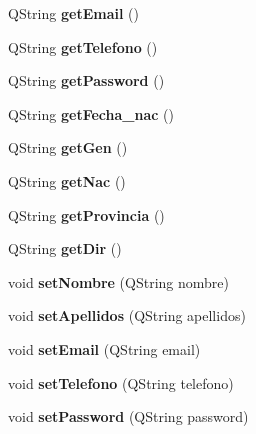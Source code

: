 \begin{DoxyCompactItemize}
Q\+String {\bfseries get\+Email} ()
\item 
\mbox{\label{classUser_a94361359fc402cecf21f3ac7189121d7}} 
Q\+String {\bfseries get\+Telefono} ()
\item 
\mbox{\label{classUser_a96d673c7c62ecdfdd4c509db8350262d}} 
Q\+String {\bfseries get\+Password} ()
\item 
\mbox{\label{classUser_a038bc7578cc67dc65dcc37cab56011cc}} 
Q\+String {\bfseries get\+Fecha\+\_\+nac} ()
\item 
\mbox{\label{classUser_af6978ab530e6b4516575c569245e1cb1}} 
Q\+String {\bfseries get\+Gen} ()
\item 
\mbox{\label{classUser_a35bb4fee2f8b12cf69eb25b7949cd85c}} 
Q\+String {\bfseries get\+Nac} ()
\item 
\mbox{\label{classUser_a539732e0d7d830e5027648c429c7d1ff}} 
Q\+String {\bfseries get\+Provincia} ()
\item 
\mbox{\label{classUser_a1bbfd504de0babb6591de36bc7994673}} 
Q\+String {\bfseries get\+Dir} ()
\item 
\mbox{\label{classUser_ac8bd16ed398601492fc2550d64fa55a2}} 
void {\bfseries set\+Nombre} (Q\+String nombre)
\item 
\mbox{\label{classUser_a3bff682a17f1b65cfedd9a5e1bb2acde}} 
void {\bfseries set\+Apellidos} (Q\+String apellidos)
\item 
\mbox{\label{classUser_aa027aa9e931621418c045c6680b9461f}} 
void {\bfseries set\+Email} (Q\+String email)
\item 
\mbox{\label{classUser_a9fbcdc88fdffe99a216fc35baa7825ae}} 
void {\bfseries set\+Telefono} (Q\+String telefono)
\item 
\mbox{\label{classUser_a2fa7106fd6d96c663e34ebe82526d5ee}} 
void {\bfseries set\+Password} (Q\+String password)
\item 
\mbox{\label{classUser_a09f782800ba5217b98f0d20fc1010ca0}} 

\end{DoxyCompactItemize}
